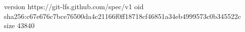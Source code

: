 version https://git-lfs.github.com/spec/v1
oid sha256:c67e676c7bce76500da4c21166f0ff18718cf46851a34eb4999573c0b345522c
size 43840
